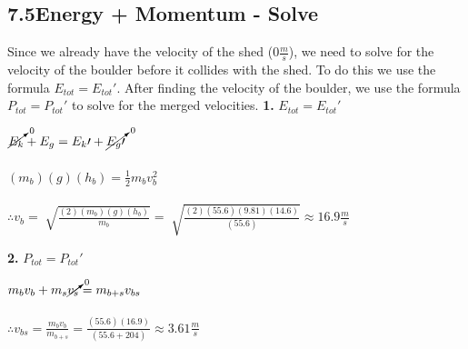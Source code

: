 \subsection*{7.5\hspace*{0.5cm}Energy + Momentum - Solve}
Since we already have the velocity of the shed (0$\frac{m}{s}$), we need to solve for the velocity of the boulder before it collides with the shed. To do this we use the formula $E_{tot} = E_{tot}\prime$. After finding the velocity of the boulder, we use the formula $P_{tot} = P_{tot}\prime$ to solve for the merged velocities.\newline\newline
\textbf{1.} $E_{tot} = E_{tot}\prime$ \\
\begin{adjustwidth}{0.6cm}{0pt}
    $\cancelto{0}{E_{k}} + E_{g} = E_{k}\prime + \cancelto{0}{E_{g}\prime}$ \\\\
    $(m_{b})(g)(h_{b}) = \frac{1}{2}m_{b}v_{b}^2$ \\\\
    $\therefore v_{b} = \sqrt[]{\frac{(2)(m_{b})(g)(h_{b})}{m_{b}}} = \sqrt[]{\frac{(2)(55.6)(9.81)(14.6)}{(55.6)}} \approx 16.9\frac{m}{s}$
\end{adjustwidth}\vspace*{15pt}
\textbf{2.} $P_{tot} = P_{tot}\prime$ \\
\begin{adjustwidth}{0.6cm}{0pt}
    $m_{b}v_{b} + m_{s}\cancelto{0}{v_{s}} = m_{b + s}v_{bs}$ \\\\
    $\therefore v_{bs} = \frac{m_{b}v_{b}}{m_{b + s}} = \frac{(55.6)(16.9)}{(55.6 + 204)} \approx 3.61\frac{m}{s}$
\end{adjustwidth}\vspace*{15pt}
